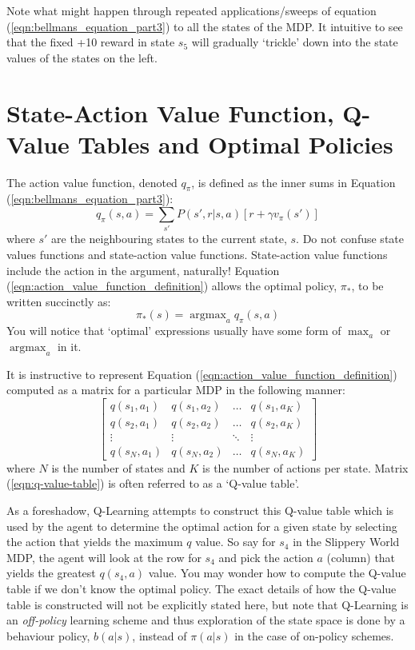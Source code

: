 \documentclass[a4paper,11pt]{article}
\DeclareMathOperator*{\argmax}{argmax}
\begin{document}
Note what might happen through repeated applications/sweeps of equation (\ref{eqn:bellmans_equation_part3}) to all the states of the MDP.  It intuitive to see that the fixed +10 reward in state $s_5$ will gradually `trickle' down into the state values of the states on the left.  



\section{State-Action Value Function, Q-Value Tables and Optimal Policies}

The action value function, denoted $q_{\pi}$, is defined as the inner sums in Equation (\ref{eqn:bellmans_equation_part3}):
\begin{equation} \label{eqn:action_value_function_definition}
    q_{\pi}(s,a) = \sum_{s'} P(s',r|s,a) [r + \gamma v_{\pi}(s')]
\end{equation}
where $s'$ are the neighbouring states to the current state, $s$.  Do not confuse state values functions and state-action value functions.  State-action value functions include the action in the argument, naturally!  Equation (\ref{eqn:action_value_function_definition}) allows the optimal policy, $\pi_{*}$, to be written succinctly as:
\begin{equation} \label{eqn:optimal_policy_wrt_action_values}
    \pi_{*}(s) = \argmax_a q_{\pi}(s,a)
\end{equation}
You will notice that `optimal' expressions usually have some form of $\max_a$ or $\argmax_a$ in it.

It is instructive to represent Equation (\ref{eqn:action_value_function_definition}) computed as a matrix for a particular MDP in the following manner:
\begin{equation} \label{eqn:q-value-table}
\begin{bmatrix}
    q(s_1,a_1) & q(s_1,a_2) & \hdots & q(s_1,a_K) \\
    q(s_2,a_1) & q(s_2,a_2) & \hdots & q(s_2,a_K) \\
    \vdots & \vdots & \ddots & \vdots \\
    q(s_N,a_1) & q(s_N,a_2) & \hdots & q(s_N,a_K)
\end{bmatrix}
\end{equation}
where $N$ is the number of states and $K$ is the number of actions per state.  Matrix (\ref{eqn:q-value-table}) is often referred to as a `Q-value table'.  

As a foreshadow, Q-Learning attempts to construct this Q-value table which is used by the agent to determine the optimal action for a given state by selecting the action that yields the maximum $q$ value.  So say for $s_4$ in the Slippery World MDP, the agent will look at the row for $s_4$ and pick the action $a$ (column) that yields the greatest $q(s_4, a)$ value.  You may wonder how to compute the Q-value table if we don't know the optimal policy.  The exact details of how the Q-value table is constructed will not be explicitly stated here, but note that Q-Learning is an {\it off-policy} learning scheme and thus exploration of the state space is done by a behaviour policy, $b(a|s)$, instead of $\pi(a|s)$ in the case of on-policy schemes.
\end{document}
